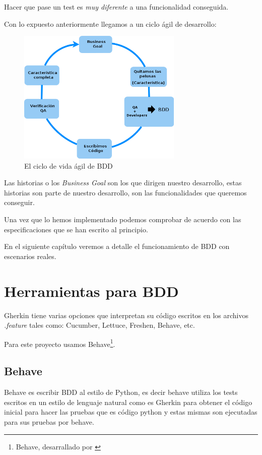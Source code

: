 \begin{mdframed}
  \centering
  Hacer que pase un test es {\it muy diferente} a una funcionalidad conseguida.
\end{mdframed}

\newpage
Con lo expuesto anteriormente llegamos a un ciclo ágil de desarrollo:

\begin{figure}[h]
  \begin{center}
  \includegraphics[width=0.7\textwidth]{figures/chapter2/bdd_cycle2.png}
  \caption[BDD]{El ciclo de vida ágil de BDD}
\end{center}
\end{figure}

Las historias o los {\it Business Goal} son los que dirigen nuestro desarrollo,
estas historias son parte de nuestro desarrollo, son las funcionalidades que
queremos conseguir.

Una vez que lo hemos implementado podemos comprobar de acuerdo con las
especificaciones que se han escrito al principio.

En el siguiente capítulo veremos a detalle el funcionamiento de BDD con escenarios
reales.

\section{Herramientas para BDD}
Gherkin tiene varias opciones que interpretan su código escritos en los archivos
{\it .feature} tales como: Cucumber, Lettuce, Freshen, Behave, etc.

Para este proyecto usamos Behave\footnote{Behave, desarrallado por \citeauthor{website:behave}}.

\subsection{Behave}
Behave es escribir BDD al estilo de Python, es decir behave utiliza los tests
escritos en un estilo de lenguaje natural como es Gherkin para obtener el código
inicial para hacer las pruebas que es código python y estas mismas son ejecutadas
para sus pruebas por behave.

